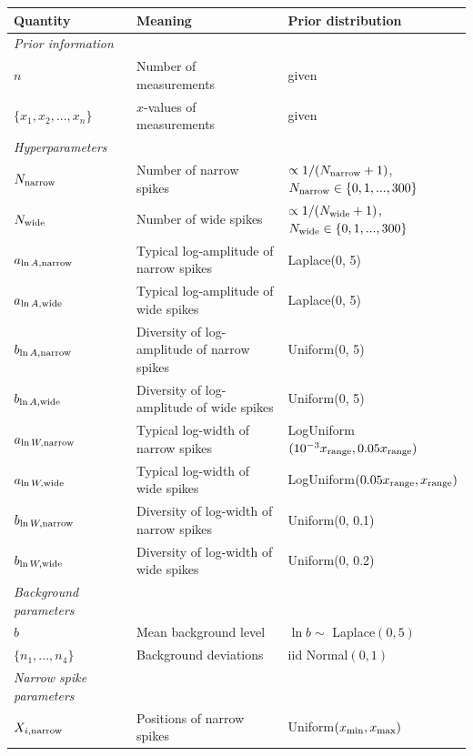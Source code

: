 \documentclass[a4paper, 12pt]{article}
\newcommand{\x}{x}
\begin{document}
\begin{landscape}

\begin{table}
\footnotesize
\centering
\begin{tabular}{|lll|}
\hline
{\bf Quantity}      &   {\bf Meaning}   &  {\bf Prior distribution}\\
\hline
{\em Prior information}&&\\
\hline
$n$ & Number of measurements & given\\
$\{\x_1, \x_2, ..., \x_n\}$  & $\x$-values of measurements & given \\
\hline
{\em Hyperparameters} & &\\
$N_{\rm narrow}$   &   Number of narrow spikes    &  $\propto 1/(N_{\rm narrow}+1)$, $N_{\rm narrow} \in \{0, 1, ..., 300\}$ \\
$N_{\rm wide}$   &   Number of wide spikes    &  $\propto 1/(N_{\rm wide}+1)$,
$N_{\rm wide} \in \{0, 1, ..., 300\}$ \\
$a_{\ln A, \rm narrow}$ & Typical log-amplitude of narrow spikes & Laplace(0, 5)\\
$a_{\ln A, \rm wide}$ & Typical log-amplitude of wide spikes & Laplace(0, 5)\\
$b_{\ln A, \rm narrow}$ & Diversity of log-amplitude of narrow spikes & Uniform(0, 5)\\
$b_{\ln A, \rm wide}$ & Diversity of log-amplitude of wide spikes & Uniform(0, 5)\\
$a_{\ln W, \rm narrow}$ & Typical log-width of narrow spikes & LogUniform$(10^{-3}x_{\rm range}, 0.05x_{\rm range})$\\
$a_{\ln W, \rm wide}$ & Typical log-width of wide spikes & LogUniform$(0.05x_{\rm range}, x_{\rm range})$\\
$b_{\ln W, \rm narrow}$ & Diversity of log-width of narrow spikes & Uniform(0, 0.1)\\
$b_{\ln W, \rm wide}$ & Diversity of log-width of wide spikes & Uniform(0, 0.2)\\
\hline
{\em Background parameters}&&\\
$b$       & Mean background level       & $\ln b \sim $ Laplace$(0, 5)$\\
$\{n_1, ..., n_4\}$  & Background deviations & iid Normal$(0,1)$\\
\hline
{\em Narrow spike parameters}&&\\
$X_{i, \rm narrow}$ & Positions of narrow spikes &
                            Uniform$(x_{\rm min}, x_{\rm max})$ \\

\end{tabular}
\end{table}
\end{landscape}
\end{document}
